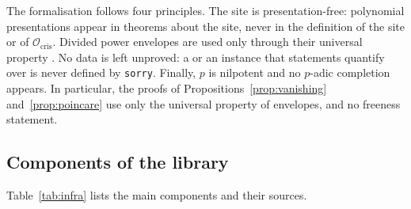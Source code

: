 \documentclass[11pt]{amsart}
\newcommand{\spa}{\medskip}
\newcommand{\Ocris}{\mathcal{O}_{\mathrm{cris}}}
\theoremstyle{plain}
\theoremstyle{definition}
\theoremstyle{remark}
\begin{document}
\spa

The formalisation follows four principles. The site is presentation-free: polynomial presentations appear in theorems about the site, never in the definition of the site or of $\Ocris$. Divided power envelopes are used only through their universal property . No data is left unproved: a  or an instance that statements quantify over is never defined by \texttt{sorry}. Finally, $p$ is nilpotent and no $p$-adic completion appears. In particular, the proofs of Propositions~\ref{prop:vanishing} and~\ref{prop:poincare} use only the universal property of envelopes, and no freeness statement.

\subsection{Components of the library}

Table~\ref{tab:infra} lists the main components and their sources.
\end{document}
